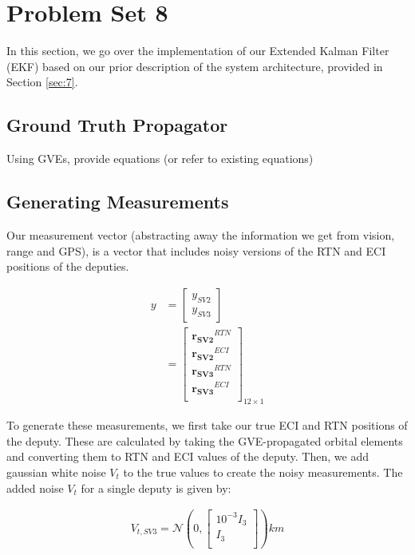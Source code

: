\section{Problem Set 8}

In this section, we go over the implementation of our Extended Kalman Filter (EKF) based on our prior description of the system architecture, provided in Section \ref{sec:7}. 

\subsection{Ground Truth Propagator}

Using GVEs, provide equations (or refer to existing equations)

\subsection{Generating Measurements}

Our measurement vector (abstracting away the information we get from vision, range and GPS), is a vector that includes noisy versions of the RTN and ECI positions of the deputies. 

\begin{align}
    y &= \begin{bmatrix}
        y_{SV2} \\
        y_{SV3}
    \end{bmatrix} \\
    &= \begin{bmatrix}
        \boldsymbol{r_{SV2}}^{RTN}\\
        \boldsymbol{r_{SV2}}^{ECI} \\
        \boldsymbol{r_{SV3}}^{RTN} \\
        \boldsymbol{r_{SV3}}^{ECI} \\
    \end{bmatrix}_{12\times 1}
\end{align}

To generate these measurements, we first take our true ECI and RTN positions of the deputy. These are calculated by taking the GVE-propagated orbital elements and converting them to RTN and ECI values of the deputy. Then, we add gaussian white noise $V_t$ to the true values to create the noisy measurements. The added noise $V_t$ for a single deputy is given by:

\begin{align}
    V_{t, SV3} = \mathcal{N}\left(0, \begin{bmatrix}
        10^{-3} I_3 \\
         I_3 \\
 \end{bmatrix}\right) km
\end{align}

